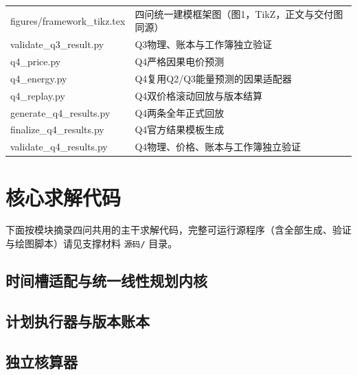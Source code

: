 \documentclass[withoutpreface,bwprint]{cumcmthesis}
\begin{document}
\begin{appendices}
\begin{table}[H]
\begin{tabularx}{\textwidth}{LL}
figures/framework\_tikz.tex & 四问统一建模框架图（图1，TikZ，正文与交付图同源） \\
validate\_q3\_result.py & Q3物理、账本与工作簿独立验证 \\
q4\_price.py & Q4严格因果电价预测 \\
q4\_energy.py & Q4复用Q2/Q3能量预测的因果适配器 \\
q4\_replay.py & Q4双价格滚动回放与版本结算 \\
generate\_q4\_results.py & Q4两条全年正式回放 \\
finalize\_q4\_results.py & Q4官方结果模板生成 \\
validate\_q4\_results.py & Q4物理、价格、账本与工作簿独立验证 \\
\bottomrule
\end{tabularx}
\label{tab:文件列表}
\end{table}









\section{核心求解代码}

下面按模块摘录四问共用的主干求解代码，完整可运行源程序（含全部生成、验证与绘图脚本）请见支撑材料 \texttt{源码/} 目录。

\lstset{basicstyle=\yaheiconsola\footnotesize,xleftmargin=0pt,aboveskip=4pt,belowskip=4pt}

\subsection{时间槽适配与统一线性规划内核}




\subsection{计划执行器与版本账本}


\subsection{独立核算器}




\end{appendices}
\end{document}
